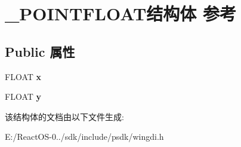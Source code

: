 \hypertarget{struct___p_o_i_n_t_f_l_o_a_t}{}\section{\+\_\+\+P\+O\+I\+N\+T\+F\+L\+O\+A\+T结构体 参考}
\label{struct___p_o_i_n_t_f_l_o_a_t}
\subsection*{Public 属性}
\begin{DoxyCompactItemize}
\item 
\mbox{\label{struct___p_o_i_n_t_f_l_o_a_t_a94b49cbfcb7c6be85e0b0dfec80502ee}} 
F\+L\+O\+AT {\bfseries x}
\item 
\mbox{\label{struct___p_o_i_n_t_f_l_o_a_t_aab7c8eb5d35be8f0d05a7b7e50514247}} 
F\+L\+O\+AT {\bfseries y}
\end{DoxyCompactItemize}


该结构体的文档由以下文件生成\+:\begin{DoxyCompactItemize}
\item 
E\+:/\+React\+O\+S-\/0../sdk/include/psdk/wingdi.\+h\end{DoxyCompactItemize}
